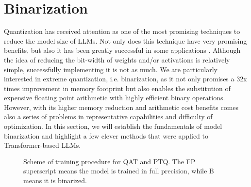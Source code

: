 \newcommand{\sign}{\text{sign}}
\newcommand{\bool}{\text{bool}}
\section{Binarization}

Quantization has received attention as one of the most promising techniques to reduce the model size of LLMs. Not only does this technique have very promising benefits, but also it has been greatly successful in some applications \cite{liu2020reactnet}\cite{rastegari2016xnornet}. Although the idea of reducing the bit-width of weights and/or activations is relatively simple, successfully implementing it is not as much. We are particularly interested in extreme quantization, i.e. binarization, as it not only promises a 32x times improvement in memory footprint but also enables the substitution of expensive floating point arithmetic with highly efficient binary operations. However, with its higher memory reduction and arithmetic cost benefits comes also a series of problems in representative capabilities and difficulty of optimization. In this section, we will establish the fundamentals of model binarization and highlight a few clever methods that were applied to Transformer-based LLMs.

\begin{figure}[!ht]
\centering
{}%
\caption{Scheme of training procedure for QAT and PTQ. The FP superscript means the model is trained in full precision, while B means it is binarized.}
\label{fig:quant_scheme}
\end{figure}

